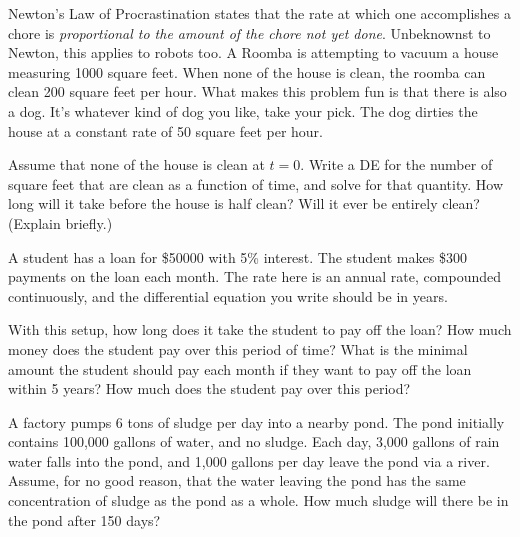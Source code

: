 \documentclass{ximera}
\begin{document}
\begin{exercise}
    Newton's Law of Procrastination states that the rate at which one accomplishes a chore is {\it proportional to the amount of the chore not yet done}. Unbeknownst to Newton, this applies to robots too. A Roomba is attempting to vacuum a house measuring 1000 square feet. When none of the house is clean, the roomba can clean 200 square feet per hour. What makes this problem fun is that there is also a dog. It's whatever kind of dog you like, take your pick. The dog dirties the house at a constant rate of 50 square feet per hour.
    \begin{tasks}
        \task Assume that none of the house is clean at $t=0$. Write a DE for  the number of square feet that are clean as a function of time, and solve for that quantity.
        \task How long will it take before the house is half clean? Will it ever be entirely clean? (Explain briefly.)
    \end{tasks}
\end{exercise}

\begin{exercise}
    A student has a loan for \$50000 with 5\% interest. The student makes \$300 payments on the loan each month. The rate here is an annual rate, compounded continuously, and the differential equation you write should be in years.
    \begin{tasks}
        \task With this setup, how long does it take the student to pay off the loan? How much money does the student pay over this period of time?
        \task What is the minimal amount the student should pay each month if they want to pay off the loan within 5 years? How much does the student pay over this period?
    \end{tasks}
\end{exercise}

\begin{exercise}
    A factory pumps 6 tons of sludge per day into a nearby pond. The pond initially contains 100,000 gallons of water, and no sludge. Each day, 3,000 gallons of rain water falls into the pond, and 1,000 gallons per day leave the pond via a river. Assume, for no good reason, that the water leaving the pond has the same concentration of sludge as the pond as a whole. How much sludge will there be in the pond after 150 days? %
\end{exercise}
\end{document}
